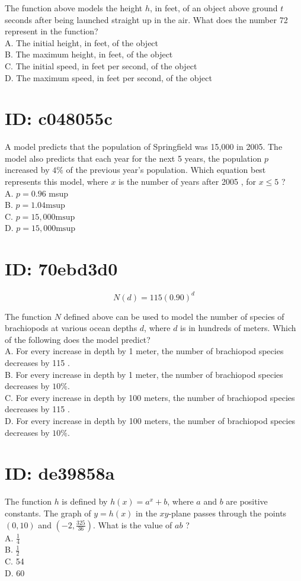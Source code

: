 The function above models the height $h$, in feet, of an object above ground $t$ seconds after being launched straight up in the air. What does the number 72 represent in the function?\\
A. The initial height, in feet, of the object\\
B. The maximum height, in feet, of the object\\
C. The initial speed, in feet per second, of the object\\
D. The maximum speed, in feet per second, of the object

\section*{ID: c048055c}
A model predicts that the population of Springfield was 15,000 in 2005. The model also predicts that each year for the next 5 years, the population $p$ increased by $4 \%$ of the previous year's population. Which equation best represents this model, where $x$ is the number of years after 2005 , for $x \leq 5$ ?\\
A. $p=0.96$ msup\\
B. $p=1.04 \mathrm{msup}$\\
C. $p=15,000 \mathrm{msup}$\\
D. $p=15,000 \mathrm{msup}$

\section*{ID: 70ebd3d0}
$$
N(d)=115(0.90)^{d}
$$

The function $N$ defined above can be used to model the number of species of brachiopods at various ocean depths $d$, where $d$ is in hundreds of meters. Which of the following does the model predict?\\
A. For every increase in depth by 1 meter, the number of brachiopod species decreases by 115 .\\
B. For every increase in depth by 1 meter, the number of brachiopod species decreases by $10 \%$.\\
C. For every increase in depth by 100 meters, the number of brachiopod species decreases by 115 .\\
D. For every increase in depth by 100 meters, the number of brachiopod species decreases by $10 \%$.

\section*{ID: de39858a}
The function $h$ is defined by $h(x)=a^{x}+b$, where $a$ and $b$ are positive constants. The graph of $y=h(x)$ in the $x y$-plane passes through the points $(0,10)$ and $\left(-2, \frac{325}{36}\right)$. What is the value of $a b$ ?\\
A. $\frac{1}{4}$\\
B. $\frac{1}{2}$\\
C. 54\\
D. 60

